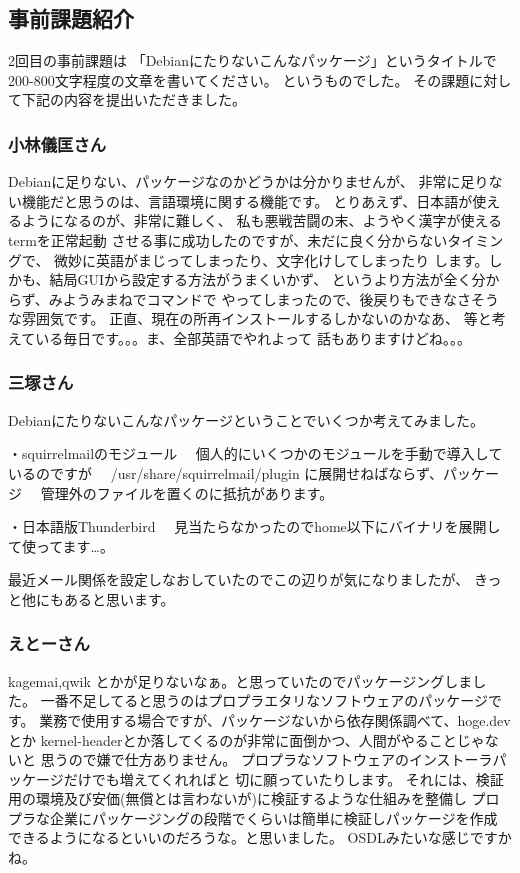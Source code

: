 \documentclass[mingoth]{jsarticle}
\begin{document}
\subsection{事前課題紹介}

2回目の事前課題は
「Debianにたりないこんなパッケージ」というタイトルで200-800文字程度の文章を書いてください。
というものでした。
その課題に対して下記の内容を提出いただきました。

\subsubsection{小林儀匡さん}

Debianに足りない、パッケージなのかどうかは分かりませんが、
非常に足りない機能だと思うのは、言語環境に関する機能です。
とりあえず、日本語が使えるようになるのが、非常に難しく、
私も悪戦苦闘の末、ようやく漢字が使えるtermを正常起動
させる事に成功したのですが、未だに良く分からないタイミングで、
微妙に英語がまじってしまったり、文字化けしてしまったり
します。しかも、結局GUIから設定する方法がうまくいかず、
というより方法が全く分からず、みようみまねでコマンドで
やってしまったので、後戻りもできなさそうな雰囲気です。
正直、現在の所再インストールするしかないのかなあ、
等と考えている毎日です。。。ま、全部英語でやれよって
話もありますけどね。。。

\subsubsection{三塚さん}

Debianにたりないこんなパッケージということでいくつか考えてみました。

・squirrelmailのモジュール
　個人的にいくつかのモジュールを手動で導入しているのですが
　/usr/share/squirrelmail/plugin に展開せねばならず、パッケージ
　管理外のファイルを置くのに抵抗があります。

・日本語版Thunderbird
　見当たらなかったのでhome以下にバイナリを展開して使ってます…。

最近メール関係を設定しなおしていたのでこの辺りが気になりましたが、
きっと他にもあると思います。

\subsubsection{えとーさん}
kagemai,qwik とかが足りないなぁ。と思っていたのでパッケージングしました。
一番不足してると思うのはプロプラエタリなソフトウェアのパッケージです。
業務で使用する場合ですが、パッケージないから依存関係調べて、hoge.devとか
kernel-headerとか落してくるのが非常に面倒かつ、人間がやることじゃないと
思うので嫌で仕方ありません。
プロプラなソフトウェアのインストーラパッケージだけでも増えてくれればと
切に願っていたりします。
それには、検証用の環境及び安価(無償とは言わないが)に検証するような仕組みを整備し
プロプラな企業にパッケージングの段階でくらいは簡単に検証しパッケージを作成
できるようになるといいのだろうな。と思いました。
OSDLみたいな感じですかね。
\end{document}
